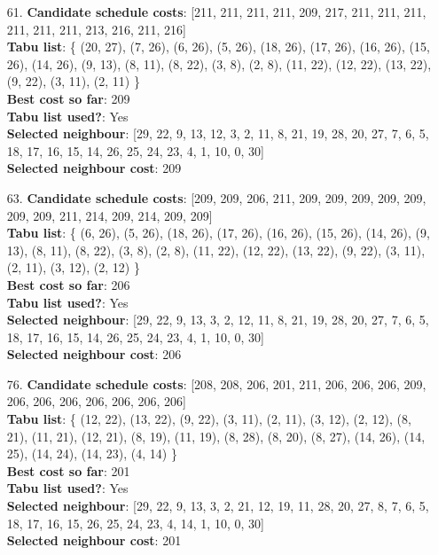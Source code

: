 \documentclass[fleqn]{article}
\begin{document}
\begin{itemize}
    \item[61.] \textbf{Candidate schedule costs}: [211, 211, 211, 211, 209, 217, 211, 211, 211, 211, 211, 211, 213, 216, 211, 216] \\
    \textbf{Tabu list}: \{ (20, 27), (7, 26), (6, 26), (5, 26), (18, 26), (17, 26), (16, 26), (15, 26), (14, 26), (9, 13), (8, 11), (8, 22), (3, 8), (2, 8), (11, 22), (12, 22), (13, 22), (9, 22), (3, 11), (2, 11) \} \\
    \textbf{Best cost so far}: 209 \\
    \textbf{Tabu list used?}: Yes \\
    \textbf{Selected neighbour}: [29, 22, 9, 13, 12, 3, 2, 11, 8, 21, 19, 28, 20, 27, 7, 6, 5, 18, 17, 16, 15, 14, 26, 25, 24, 23, 4, 1, 10, 0, 30] \\
    \textbf{Selected neighbour cost}: 209
      

    \item[63.] \textbf{Candidate schedule costs}: [209, 209, 206, 211, 209, 209, 209, 209, 209, 209, 209, 211, 214, 209, 214, 209, 209] \\
    \textbf{Tabu list}: \{ (6, 26), (5, 26), (18, 26), (17, 26), (16, 26), (15, 26), (14, 26), (9, 13), (8, 11), (8, 22), (3, 8), (2, 8), (11, 22), (12, 22), (13, 22), (9, 22), (3, 11), (2, 11), (3, 12), (2, 12) \} \\
    \textbf{Best cost so far}: 206 \\
    \textbf{Tabu list used?}: Yes \\
    \textbf{Selected neighbour}: [29, 22, 9, 13, 3, 2, 12, 11, 8, 21, 19, 28, 20, 27, 7, 6, 5, 18, 17, 16, 15, 14, 26, 25, 24, 23, 4, 1, 10, 0, 30] \\
    \textbf{Selected neighbour cost}: 206
      

    \item[76.] \textbf{Candidate schedule costs}: [208, 208, 206, 201, 211, 206, 206, 206, 209, 206, 206, 206, 206, 206, 206, 206] \\
    \textbf{Tabu list}: \{ (12, 22), (13, 22), (9, 22), (3, 11), (2, 11), (3, 12), (2, 12), (8, 21), (11, 21), (12, 21), (8, 19), (11, 19), (8, 28), (8, 20), (8, 27), (14, 26), (14, 25), (14, 24), (14, 23), (4, 14) \} \\
    \textbf{Best cost so far}: 201 \\
    \textbf{Tabu list used?}: Yes \\
    \textbf{Selected neighbour}: [29, 22, 9, 13, 3, 2, 21, 12, 19, 11, 28, 20, 27, 8, 7, 6, 5, 18, 17, 16, 15, 26, 25, 24, 23, 4, 14, 1, 10, 0, 30] \\
    \textbf{Selected neighbour cost}: 201
      


\end{itemize}
\end{document}
